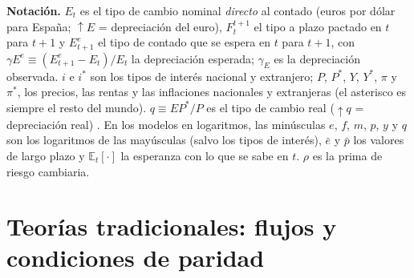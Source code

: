 \documentclass[11pt]{article}
\begin{document}
\begin{anotaciones}[unbreakable]
\textbf{Notación.} $E_t$ es el tipo de cambio nominal \emph{directo} al contado (euros por dólar para España; $\uparrow E$ = depreciación del euro), $F_t^{t+1}$ el tipo a plazo pactado en $t$ para $t+1$ y $E^e_{t+1}$ el tipo de contado que se espera en $t$ para $t+1$, con $\gamma E^e\equiv(E^e_{t+1}-E_t)/E_t$ la depreciación esperada; $\gamma_E$ es la depreciación observada. $i$ e $i^{*}$ son los tipos de interés nacional y extranjero; $P$, $P^*$, $Y$, $Y^*$, $\pi$ y $\pi^*$, los precios, las rentas y las inflaciones nacionales y extranjeras (el asterisco es siempre el resto del mundo). $q\equiv EP^{*}/P$ es el tipo de cambio real ($\uparrow q$ = depreciación real) . En los modelos en logaritmos, las minúsculas $e$, $f$, $m$, $p$, $y$ y $q$ son los logaritmos de las mayúsculas (salvo los tipos de interés), $\bar e$ y $\bar p$ los valores de largo plazo y $\mathbb{E}_t[\cdot]$ la esperanza con lo que se sabe en $t$. $\rho$ es la prima de riesgo cambiaria.
\end{anotaciones}

\begin{infografia}[H]
\centering
\caption{La evolución de las teorías del tipo de cambio y el papel de la evidencia empírica}\label{figu:evolucion}
\end{infografia}

\section{Teorías tradicionales: flujos y condiciones de paridad}\label{sec:tradicionales}
\end{document}
